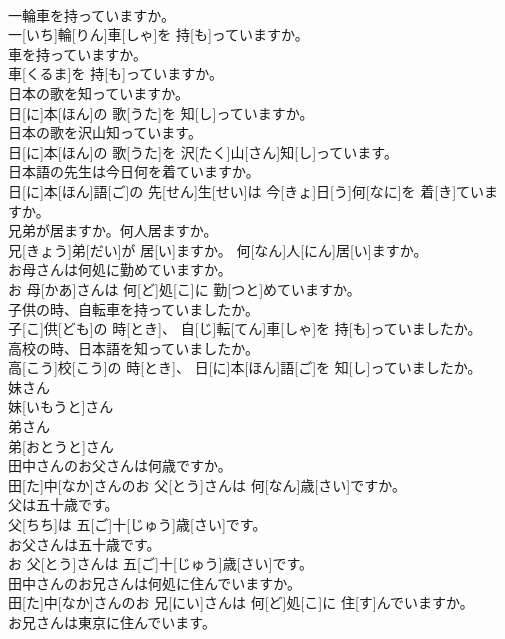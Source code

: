 \documentclass[8pt]{extreport}
\begin{document}
\begin{CJK}{UTF8}{min}
\\	一輪車を持っていますか。	
\\	一[いち]輪[りん]車[しゃ]を 持[も]っていますか。
\\	車を持っていますか。	
\\	車[くるま]を 持[も]っていますか。
\\	日本の歌を知っていますか。	
\\	日[に]本[ほん]の 歌[うた]を 知[し]っていますか。
\\	日本の歌を沢山知っています。	
\\	日[に]本[ほん]の 歌[うた]を 沢[たく]山[さん]知[し]っています。
\\	日本語の先生は今日何を着ていますか。	
\\	日[に]本[ほん]語[ご]の 先[せん]生[せい]は 今[きょ]日[う]何[なに]を 着[き]ていますか。
\\	兄弟が居ますか。何人居ますか。	
\\	兄[きょう]弟[だい]が 居[い]ますか。 何[なん]人[にん]居[い]ますか。
\\	お母さんは何処に勤めていますか。	
\\	お 母[かあ]さんは 何[ど]処[こ]に 勤[つと]めていますか。
\\	子供の時、自転車を持っていましたか。	
\\	子[こ]供[ども]の 時[とき]、 自[じ]転[てん]車[しゃ]を 持[も]っていましたか。
\\	高校の時、日本語を知っていましたか。	
\\	高[こう]校[こう]の 時[とき]、 日[に]本[ほん]語[ご]を 知[し]っていましたか。
\\	妹さん	
\\	妹[いもうと]さん
\\	弟さん	
\\	弟[おとうと]さん
\\	田中さんのお父さんは何歳ですか。	
\\	田[た]中[なか]さんのお 父[とう]さんは 何[なん]歳[さい]ですか。
\\	父は五十歳です。	
\\	父[ちち]は 五[ご]十[じゅう]歳[さい]です。
\\	お父さんは五十歳です。	
\\	お 父[とう]さんは 五[ご]十[じゅう]歳[さい]です。
\\	田中さんのお兄さんは何処に住んでいますか。	
\\	田[た]中[なか]さんのお 兄[にい]さんは 何[ど]処[こ]に 住[す]んでいますか。
\\	お兄さんは東京に住んでいます。	

\end{CJK}
\end{document}
